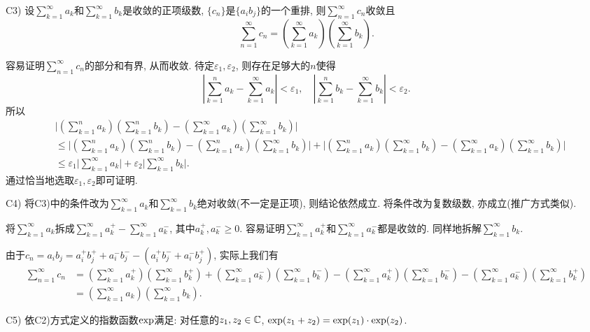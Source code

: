 C3) 设$\sum_{k=1}^{\infty} a_k$和$\sum_{k=1}^{\infty} b_k$是收敛的正项级数, $\{ c_n \}$是$\{ a_ib_j \}$的一个重排, 则$\sum_{n=1}^{\infty} c_n$收敛且$$\sum_{n=1}^{\infty} c_n = (\sum_{k=1}^{\infty} a_k)(\sum_{k=1}^{\infty} b_k).$$

\begin{solution}
	容易证明$\sum_{n=1}^{\infty} c_n$的部分和有界, 从而收敛. 待定$\varepsilon _1,\varepsilon _2$, 则存在足够大的$n$使得$$|\sum_{k=1}^{n} a_k - \sum_{k=1}^{\infty} a_k| < \varepsilon _1, \quad |\sum_{k=1}^{n} b_k - \sum_{k=1}^{\infty} b_k| < \varepsilon _2.$$
	所以
	\begin{align*}
		& \big|(\sum_{k=1}^{n} a_k)(\sum_{k=1}^{n} b_k) -(\sum_{k=1}^{\infty} a_k)(\sum_{k=1}^{\infty} b_k)  \big| \\
		& \leq \big|(\sum_{k=1}^{n} a_k)(\sum_{k=1}^{n} b_k)-(\sum_{k=1}^{n} a_k)(\sum_{k=1}^{\infty} b_k)\big|+\big|(\sum_{k=1}^{n} a_k)(\sum_{k=1}^{\infty} b_k)-(\sum_{k=1}^{\infty} a_k)(\sum_{k=1}^{\infty} b_k)\big| \\
		& \leq \varepsilon _1 \big| \sum_{k=1}^{\infty} a_k \big| + \varepsilon _2 \big| \sum_{k=1}^{\infty} b_k \big|.
	\end{align*}
	通过恰当地选取$\varepsilon _1, \varepsilon _2$即可证明. 
\end{solution}

C4) 将C3)中的条件改为$\sum_{k=1}^{\infty} a_k$和$\sum_{k=1}^{\infty} b_k$绝对收敛(不一定是正项), 则结论依然成立. 将条件改为复数级数, 亦成立(推广方式类似). 

\begin{solution}
	将$\sum_{k=1}^{\infty} a_k$拆成$\sum_{k=1}^{\infty} a_k^+ - \sum_{k=1}^{\infty} a_k^-$, 其中$a_k^+,a_k^- \geq 0$. 容易证明$\sum_{k=1}^{\infty} a_k^+$和$\sum_{k=1}^{\infty} a_k^-$都是收敛的. 同样地拆解$\sum_{k=1}^{\infty} b_k$. 
	
	由于$c_n=a_ib_j=a_i^+b_j^+ + a_i^-b_j^- - (a_i^+b_j^- + a_i^-b_j^+)$, 实际上我们有
	\begin{align*}
		\sum_{n=1}^{\infty} c_n &= (\sum_{k=1}^{\infty} a_k^+)(\sum_{k=1}^{\infty} b_k^+) + (\sum_{k=1}^{\infty} a_k^-)(\sum_{k=1}^{\infty} b_k^-) - (\sum_{k=1}^{\infty} a_k^+)(\sum_{k=1}^{\infty} b_k^-) - (\sum_{k=1}^{\infty} a_k^-)(\sum_{k=1}^{\infty} b_k^+) \\
		&= (\sum_{k=1}^{\infty} a_k)(\sum_{k=1}^{\infty} b_k).
	\end{align*}
\end{solution}

C5) 依C2)方式定义的指数函数${\rm exp}$满足: 对任意的$z_1,z_2 \in \mathbb{C}$, ${\rm exp}(z_1+z_2) = {\rm exp} (z_1) \cdot {\rm exp} (z_2)$. 

